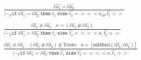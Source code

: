 \documentclass[10pt]{../sigplanconf}
\newcommand{\nfrac}[2]{\frac{\displaystyle{#1}}{\displaystyle{#2}}}
\newcommand{\tagsc}[1]{\tag{\scshape #1}}
\begin{document}
\begin{figure}
  \begin{align}
    \nfrac{
      \widehat{ea_1} = \widehat{ea_2}
    }{
      |-_\Gamma \texttt{if $\widehat{ea_1}$ = $\widehat{ea_2}$ then $\widehat{t_1}$ else $\widehat{t_2}$} => <<\kappa_{id},\widehat{t_1}>>
    } \tagsc{If-Eq}
\\\nonumber\\
    \nfrac{
      \widehat{ea_1} \neq \widehat{ea_2} \quad \kappa = (\widehat{ea_1}\ \#\ \widehat{ea_2})
    }{
      |-_\Gamma \texttt{if $\widehat{ea_1}$ = $\widehat{ea_2}$ then $\widehat{t_1}$ else $\widehat{t_2}$} => <<\kappa, \widehat{t_2}>>
    } \tagsc{If-Neq-False}
\\\nonumber\\
    \nfrac{
      \widehat{ea_1} \neq \widehat{ea_2} \quad (\widehat{ea_1}\ \#\ \widehat{ea_2}) \not \in \textrm{Tauto} \quad \kappa = [\textrm{mkBind}(\widehat{ea_1}, \widehat{ea_2})]
    }{
      |-_\Gamma \texttt{if $\widehat{ea_1}$ = $\widehat{ea_2}$ then $\widehat{t_1}$ else $\widehat{t_2}$} => <<\kappa, \widehat{t_1}>>
    } \tagsc{If-Neq-True}
  \end{align}

  ~\newline


\end{figure}
\end{document}
